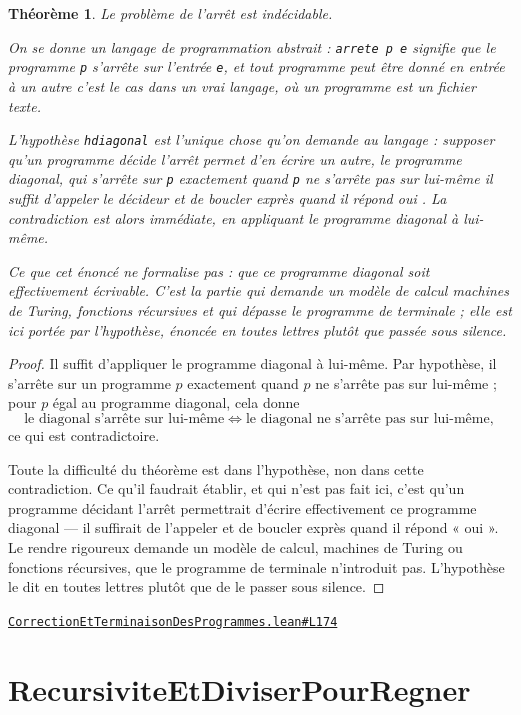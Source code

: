 \documentclass[11pt,a4paper]{article}
\theoremstyle{definition}
\theoremstyle{plain}
\newtheorem{theoreme}{Théorème}
\newcommand{\source}[2]{\par\smallskip\noindent\hfill{\footnotesize\href{#1}{\texttt{#2}}}\par\smallskip}
\begin{document}
\begin{theoreme}
Le problème de l'arrêt est indécidable.

On se donne un langage de programmation abstrait : \texttt{arrete p e} signifie que le
programme \texttt{p} s'arrête sur l'entrée \texttt{e}, et tout programme peut être donné en entrée
à un autre \textemdash{} c'est le cas dans un vrai langage, où un programme est un fichier
texte.

L'hypothèse \texttt{hdiagonal} est l'unique chose qu'on demande au langage : supposer qu'un
programme décide l'arrêt permet d'en écrire un autre, le programme diagonal, qui
s'arrête sur \texttt{p} exactement quand \texttt{p} ne s'arrête pas sur lui-même \textemdash{} il suffit
d'appeler le décideur et de boucler exprès quand il répond \og{} oui \fg{}. La contradiction
est alors immédiate, en appliquant le programme diagonal à lui-même.

Ce que cet énoncé ne formalise pas : que ce programme diagonal soit effectivement
écrivable. C'est la partie qui demande un modèle de calcul \textemdash{} machines de Turing,
fonctions récursives \textemdash{} et qui dépasse le programme de terminale ; elle est ici
portée par l'hypothèse, énoncée en toutes lettres plutôt que passée sous silence.
\end{theoreme}
\begin{proof}
Il suffit d'appliquer le programme diagonal à lui-même. Par hypothèse, il s'arrête sur
un programme \(p\) exactement quand \(p\) ne s'arrête pas sur lui-même ; pour \(p\) égal
au programme diagonal, cela donne
\[ \text{le diagonal s'arrête sur lui-même} \iff
   \text{le diagonal ne s'arrête pas sur lui-même} , \]
ce qui est contradictoire.

Toute la difficulté du théorème est dans l'hypothèse, non dans cette contradiction. Ce
qu'il faudrait établir, et qui n'est pas fait ici, c'est qu'un programme décidant
l'arrêt permettrait d'écrire effectivement ce programme diagonal — il suffirait de
l'appeler et de boucler exprès quand il répond « oui ». Le rendre rigoureux demande un
modèle de calcul, machines de Turing ou fonctions récursives, que le programme de
terminale n'introduit pas. L'hypothèse le dit en toutes lettres plutôt que de le passer
sous silence.
\end{proof}
\source{https://github.com/Commutator-IO/learn-lean/blob/main/courses/02-lycee/11-informatique-nsi/CorrectionEtTerminaisonDesProgrammes.lean\#L174}{CorrectionEtTerminaisonDesProgrammes.lean\#L174}

\section{RecursiviteEtDiviserPourRegner}
\end{document}
